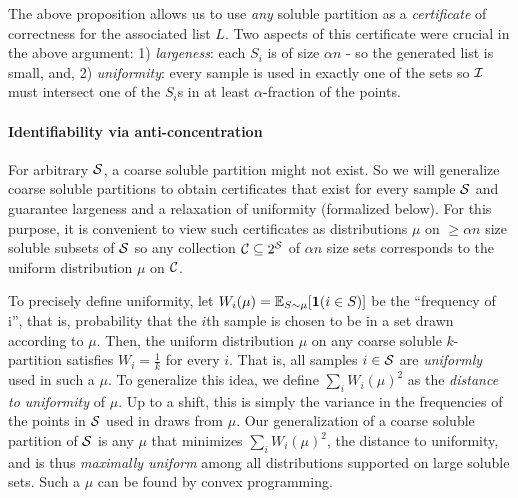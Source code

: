 The above proposition allows us to use \emph{any} soluble partition as a \emph{certificate} of correctness for the associated list $L$. Two aspects of this certificate were crucial in the above argument: 1) \emph{largeness}: each $S_i$ is of size $\alpha n$ - so the generated list is small, and, 2) \emph{uniformity}: every sample is used in exactly one of the sets so $\mathcal I$ must intersect one of the $S_i$s in at least $\alpha$-fraction of the points. 

\paragraph{Identifiability via anti-concentration} For arbitrary $\mathcal S$, a coarse soluble partition might not exist. So we will generalize coarse soluble partitions to obtain certificates that exist for every sample $\mathcal S$ and guarantee largeness and a relaxation of uniformity (formalized below). For this purpose, it is convenient to view such certificates as distributions $\mu$ on $\geq \alpha n$ size soluble subsets of $\mathcal S$ so any collection $\mathcal C\subseteq 2^{\mathcal S}$ of $\alpha n$ size sets corresponds to the uniform distribution $\mu$ on  $\mathcal C$. 

To precisely define uniformity, let $W_i(\mu) = \mathbb{E}_{S \sim \mu} [ \bm{1}(i \in S)]$ be the ``frequency of i'', that is, probability that the $i$th sample is chosen to be in a set drawn according to $\mu$. Then, the uniform distribution $\mu$ on any coarse soluble $k$-partition satisfies $W_i = \frac{1}{k}$ for every $i$. That is, all samples $i \in \mathcal S$ are \emph{uniformly} used in such a $\mu$. To generalize this idea, we define $\sum_i W_i(\mu)^2$ as the \emph{distance to uniformity} of $\mu$. Up to a shift, this is simply the variance in the frequencies of the points in $\mathcal S$ used in draws from $\mu$. Our generalization of a coarse soluble partition of $\mathcal S$ is any $\mu$ that minimizes $\sum_i W_i(\mu)^2$, the distance to uniformity, and is thus \emph{maximally uniform} among all distributions supported on large soluble sets. Such a $\mu$ can be found by convex programming. %


